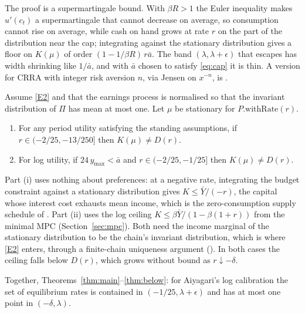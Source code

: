 The proof is a supermartingale bound. With $\beta R>1$ the Euler inequality makes
$u'(c_t)$ a supermartingale that cannot decrease on average, so consumption cannot rise on average,
while cash on hand grows at rate $r$ on the part of the distribution near the cap; integrating
against the stationary distribution gives a floor on $K(\mu)$ of order $(1-1/\beta R)\,r\bar a$.
The band $(\lambda,\lambda+\epsilon)$ that escapes has width shrinking like $1/\bar a$, and with
$\bar a$ chosen to satisfy \eqref{eq:cap} it is thin. A version for CRRA with integer risk
aversion $n$, via Jensen on $x^{-n}$, is .

\begin{theorem}\label{thm:below}
Assume \ref{E2} and that the earnings process is normalised so that the invariant distribution of
$\Pi$ has mean at most one. Let $\mu$ be stationary for $P.\text{withRate}(r)$.
\begin{enumerate}[label=(\roman*)]
\item For any period utility satisfying the standing assumptions, if $r\in(-2/25,-13/250]$ then
  $K(\mu)\ne D(r)$.
\item For log utility, if $24\,y_{\max}<\bar a$ and $r\in(-2/25,-1/25]$ then $K(\mu)\ne D(r)$.
\end{enumerate}
\end{theorem}

Part (i) uses nothing about preferences: at a negative rate, integrating the budget constraint
against a stationary distribution gives $K\le \bar Y/(-r)$, the capital whose interest cost
exhausts mean income, which is the zero-consumption supply schedule of \citet{YoungWalsh2025}.
Part (ii) uses the log ceiling $K\le\beta\bar Y/(1-\beta(1+r))$ from the minimal MPC
(Section~\ref{sec:mpc}). Both need the income marginal of the stationary distribution to be the
chain's invariant distribution, which is where \ref{E2} enters, through a finite-chain uniqueness
argument (). In both cases the ceiling falls below $D(r)$, which
grows without bound as $r\downarrow-\delta$.

Together, Theorems~\ref{thm:main}--\ref{thm:below}: for Aiyagari's log calibration the set of
equilibrium rates is contained in $(-1/25,\lambda+\epsilon)$ and has at most one point in
$(-\delta,\lambda)$.

